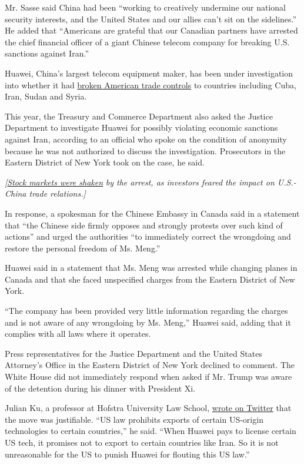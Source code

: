 Mr. Sasse said China had been ``working to creatively undermine our
national security interests, and the United States and our allies can't
sit on the sidelines.'' He added that ``Americans are grateful that our
Canadian partners have arrested the chief financial officer of a giant
Chinese telecom company for breaking U.S. sanctions against Iran.''

Huawei, China's largest telecom equipment maker, has been under
investigation into whether it had
\href{https://www.nytimes.com/2017/04/26/business/huawei-investigation-sanctions-subpoena.html}{broken
American trade controls} to countries including Cuba, Iran, Sudan and
Syria.

This year, the Treasury and Commerce Department also asked the Justice
Department to investigate Huawei for possibly violating economic
sanctions against Iran, according to an official who spoke on the
condition of anonymity because he was not authorized to discuss the
investigation. Prosecutors in the Eastern District of New York took on
the case, he said.

\emph{{[}}\href{https://www.nytimes.com/2018/12/06/business/stocks-wall-street-huawei-trade.html}{\emph{Stock
markets were shaken}} \emph{by the arrest, as investors feared the
impact on U.S.-China trade relations.{]}}

In response, a spokesman for the Chinese Embassy in Canada said in a
statement that ``the Chinese side firmly opposes and strongly protests
over such kind of actions'' and urged the authorities ``to immediately
correct the wrongdoing and restore the personal freedom of Ms. Meng.''

Huawei said in a statement that Ms. Meng was arrested while changing
planes in Canada and that she faced unspecified charges from the Eastern
District of New York.

``The company has been provided very little information regarding the
charges and is not aware of any wrongdoing by Ms. Meng,'' Huawei said,
adding that it complies with all laws where it operates.

Press representatives for the Justice Department and the United States
Attorney's Office in the Eastern District of New York declined to
comment. The White House did not immediately respond when asked if Mr.
Trump was aware of the detention during his dinner with President Xi.

Julian Ku, a professor at Hofstra University Law School,
\href{https://twitter.com/julianku/status/1070498880347889664}{wrote on
Twitter} that the move was justifiable. ``US law prohibits exports of
certain US-origin technologies to certain countries,'' he said. ``When
Huawei pays to license certain US tech, it promises not to export to
certain countries like Iran. So it is not unreasonable for the US to
punish Huawei for flouting this US law.''

